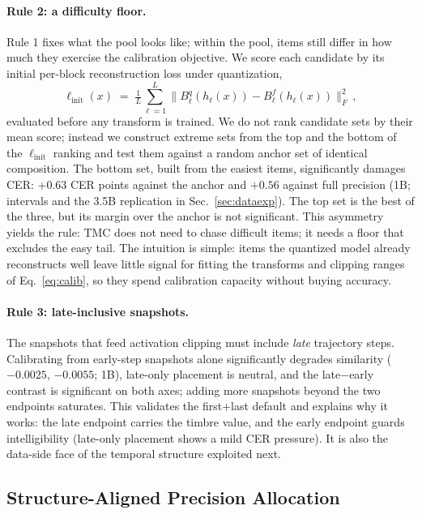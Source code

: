 \paragraph{Rule 2: a difficulty floor.}
Rule 1 fixes what the pool looks like; within the pool, items still differ in how much they exercise the calibration objective. We score each candidate by its initial per-block reconstruction loss under quantization,
\begin{equation}
\ell_{\text{init}}(x) \;=\; \tfrac{1}{L}\sum_{\ell=1}^{L} \big\| B^{q}_{\ell}(h_\ell(x)) - B^{f}_{\ell}(h_\ell(x)) \big\|_F^2\,,
\label{eq:lossinit}
\end{equation}
evaluated before any transform is trained. We do not rank candidate sets by their mean score; instead we construct extreme sets from the top and the bottom of the $\ell_{\text{init}}$ ranking and test them against a random anchor set of identical composition. The bottom set, built from the easiest items, significantly damages \hard{} CER: $+0.63$ CER points against the anchor and $+0.56$ against full precision (1B; intervals and the 3.5B replication in Sec.~\ref{sec:dataexp}). The top set is the best of the three, but its margin over the anchor is not significant. This asymmetry yields the rule: TMC does not need to chase difficult items; it needs a floor that excludes the easy tail. The intuition is simple: items the quantized model already reconstructs well leave little signal for fitting the transforms and clipping ranges of Eq.~\ref{eq:calib}, so they spend calibration capacity without buying accuracy.

\paragraph{Rule 3: late-inclusive snapshots.}
The snapshots that feed activation clipping must include \emph{late} trajectory steps. Calibrating from early-step snapshots alone significantly degrades similarity (\zh{} $-0.0025$, \en{} $-0.0055$; 1B), late-only placement is neutral, and the late$-$early contrast is significant on both axes; adding more snapshots beyond the two endpoints saturates. This validates the first+last default and explains why it works: the late endpoint carries the timbre value, and the early endpoint guards intelligibility (late-only placement shows a mild \zh{} CER pressure). It is also the data-side face of the temporal structure exploited next.

\subsection{Structure-Aligned Precision Allocation}
\label{sec:lateffn}

